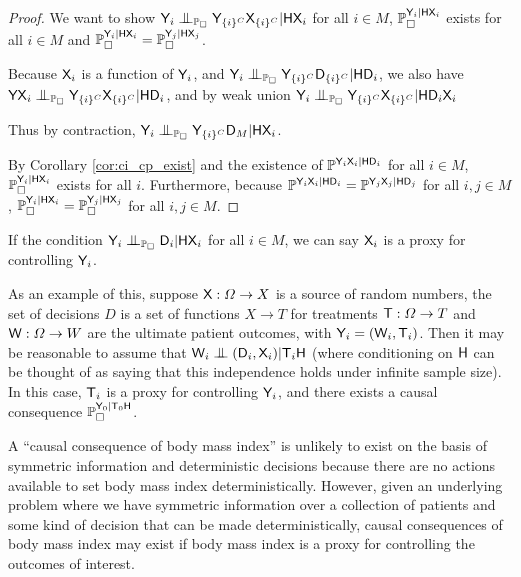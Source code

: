 \begin{proof}
We want to show $\RV{Y}_i\CI_{\prob{P}_\square} \RV{Y}_{\{i\}^C}\RV{X}_{\{i\}^C} |\RV{H}\RV{X}_i$ for all $i\in M$, $\mathbb{P}_\square^{\mathsf{Y}_i|\mathsf{H}\mathsf{X}_i}$ exists for all $i\in M$ and $\mathbb{P}_\square^{\mathsf{Y}_i|\mathsf{H}\mathsf{X}_i}=\mathbb{P}_\square^{\mathsf{Y}_j|\mathsf{H}\mathsf{X}_j}$.

Because $\mathsf{X}_i$ is a function of $\mathsf{Y}_i$, and $\RV{Y}_i\CI_{\prob{P}_\square} \RV{Y}_{\{i\}^C}\RV{D}_{\{i\}^C} |\RV{H}\RV{D}_i$, we also have $\RV{YX}_i\CI_{\prob{P}_\square} \RV{Y}_{\{i\}^C}\RV{X}_{\{i\}^C} |\RV{H}\RV{D}_i$, and by weak union $\RV{Y}_i\CI_{\prob{P}_\square} \RV{Y}_{\{i\}^C}\RV{X}_{\{i\}^C} |\RV{H}\RV{D}_i\RV{X}_i$

Thus by contraction, $\RV{Y}_i\CI_{\prob{P}_\square} \RV{Y}_{\{i\}^C}\RV{D}_{M} |\RV{H}\RV{X}_i$.

By Corollary \ref{cor:ci_cp_exist} and the existence of $\mathbb{P}^{\mathsf{Y}_i\mathsf{X}_i|\mathsf{H}\mathsf{D}_i}$ for all $i\in M$, $\mathbb{P}_\square^{\mathsf{Y}_i|\mathsf{H}\mathsf{X}_i}$ exists for all $i$. Furthermore, because $\mathbb{P}^{\mathsf{Y}_i\mathsf{X}_i|\mathsf{H}\mathsf{D}_i}=\mathbb{P}^{\mathsf{Y}_j\mathsf{X}_j|\mathsf{H}\mathsf{D}_j}$ for all $i,j\in M$, $\mathbb{P}_\square^{\mathsf{Y}_i|\mathsf{H}\mathsf{X}_i}=\mathbb{P}_\square^{\mathsf{Y}_j|\mathsf{H}\mathsf{X}_j}$ for all $i,j\in M$.
\end{proof}

If the condition $\RV{Y}_i\CI_{\prob{P}_\square} \RV{D}_i|\RV{HX}_i$ for all $i\in M$, we can say $\mathsf{X}_i$ is a proxy for controlling $\mathsf{Y}_i$.

As an example of this, suppose $\mathsf{X}:\Omega\to X$ is a source of random numbers, the set of decisions $D$ is a set of functions $X\to T$ for treatments $\mathsf{T}:\Omega\to T$ and $\mathsf{W}:\Omega\to W$ are the ultimate patient outcomes, with $\mathsf{Y}_i=(\mathsf{W}_i,\mathsf{T}_i)$. Then it may be reasonable to assume that $\RV{W}_i\CI(\RV{D}_i,\RV{X}_i)|\RV{T}_i\RV{H}$ (where conditioning on $\mathsf{H}$ can be thought of as saying that this independence holds under infinite sample size). In this case, $\mathsf{T}_i$ is a proxy for controlling $\mathsf{Y}_i$, and there exists a causal consequence $\mathbb{P}_\square^{\mathsf{Y}_0|\mathsf{T}_0\mathsf{H}}$.

A ``causal consequence of body mass index'' is unlikely to exist on the basis of symmetric information and deterministic decisions because there are no actions available to set body mass index deterministically. However, given an underlying problem where we have symmetric information over a collection of patients and some kind of decision that can be made deterministically, causal consequences of body mass index may exist if body mass index is a proxy for controlling the outcomes of interest.

